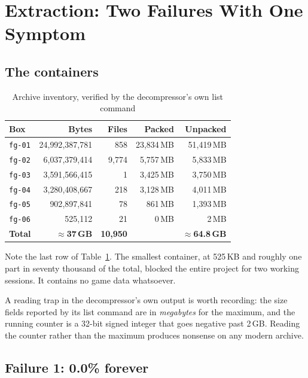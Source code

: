 \section{Extraction: Two Failures With One Symptom}
\label{sec:extract}

\subsection{The containers}

\begin{table}[htbp]
\caption{Archive inventory, verified by the decompressor's own list command}
\label{tab:inventory}
\centering
\footnotesize
\begin{tabular}{@{}lrrrr@{}}
\toprule
\textbf{Box} & \textbf{Bytes} & \textbf{Files} & \textbf{Packed} & \textbf{Unpacked} \\
\midrule
\verb|fg-01| & 24{,}992{,}387{,}781 & 858   & 23{,}834\,MB & 51{,}419\,MB \\
\verb|fg-02| &  6{,}037{,}379{,}414 & 9{,}774 &  5{,}757\,MB &  5{,}833\,MB \\
\verb|fg-03| &  3{,}591{,}566{,}415 & 1     &  3{,}425\,MB &  3{,}750\,MB \\
\verb|fg-04| &  3{,}280{,}408{,}667 & 218   &  3{,}128\,MB &  4{,}011\,MB \\
\verb|fg-05| &    902{,}897{,}841 & 78    &    861\,MB &  1{,}393\,MB \\
\verb|fg-06| &        525{,}112 & 21    &      0\,MB &      2\,MB \\
\midrule
\textbf{Total} & \textbf{$\approx$37\,GB} & \textbf{10{,}950} & & \textbf{$\approx$64.8\,GB} \\
\bottomrule
\end{tabular}
\end{table}

Note the last row of Table~\ref{tab:inventory}. The smallest container, at
525\,KB and roughly one part in seventy thousand of the total, blocked the entire
project for two working sessions. It contains no game data whatsoever.

A reading trap in the decompressor's own output is worth recording: the size
fields reported by its list command are in \emph{megabytes} for the maximum, and
the running counter is a 32-bit signed integer that goes negative past 2\,GB.
Reading the counter rather than the maximum produces nonsense on any modern
archive.

\subsection{Failure 1: 0.0\% forever}

